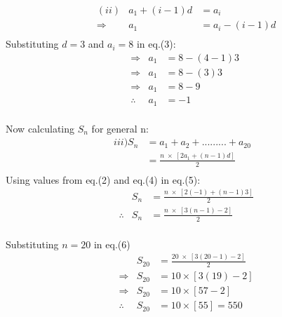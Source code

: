 \documentclass[journal, 12pt, twocolumn]{IEEEtran}
\begin{document}
    
     \begin{align*}
        &(ii)&a_1 + (i-1)d &= a_i\\
        &\Rightarrow & a_1 &= a_i - (i-1)d\tag{3}\\
         \end{align*}
Substituting $d=3$ and $a_i=8$  in eq.(3):
\begin{align*}
    &\Rightarrow & a_1 &= 8-(4-1)3  \;\\
    &\Rightarrow & a_1 &= 8-(3)3  \;\\
    &\Rightarrow & a_1 &= 8-9  \;\\
   &\therefore &  a_1 &= -1 \tag{4}\\
\end{align*}         
    
Now calculating $S_n$ for general n:   
    \begin{align*}
        iii)  S_{n} &= a_1 + a_2 + ......... + a_{20}\\
               &= \tfrac{n\;\times\;\left[2a_1 + (n-1)d\right]}{2} \tag{5}\\
    \end{align*} 
Using values from eq.(2) and eq.(4) in eq.(5):
\begin{align*}
    &  & S_{n}  &= \tfrac{n\;\times\;\left[2(-1) + (n-1)3\right]}{2}\\
   &  \therefore  & S_n  &=  \tfrac{n\;\times\;\left[3(n-1) - 2\right]}{2}\tag{6}\\
\end{align*}

Substituting $n=20$ in eq.(6) 
 \begin{align*}
    &  & S_{20}  &= \tfrac{20\;\times\;\left[3(20-1) - 2\right]}{2}\\
   &  \Rightarrow  & S_{20}  &=  10\times[3(19)-2]\\
   &  \Rightarrow  & S_{20}  &=  10\times[57-2]\\
   &  \therefore  & S_{20}  &=  10\times[55] = 550
\end{align*}

    
    
\end{document}
